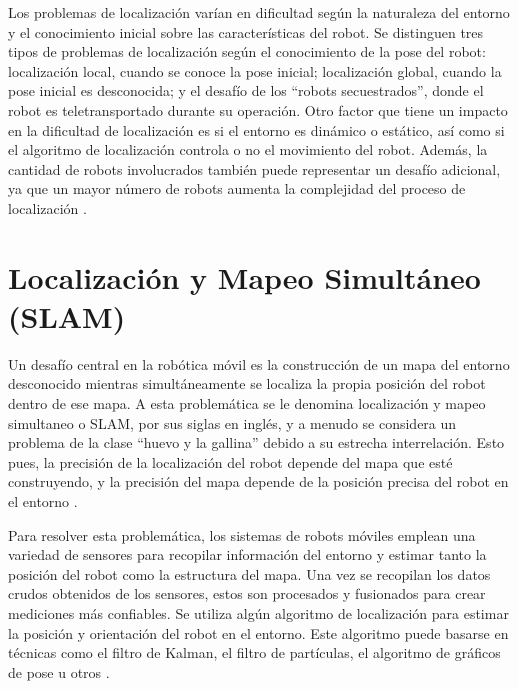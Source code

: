 Los problemas de localización varían en dificultad según la naturaleza del entorno y el conocimiento inicial sobre las características del robot. Se distinguen tres tipos de problemas de localización según el conocimiento de la pose del robot: localización local, cuando se conoce la pose inicial; localización global, cuando la pose inicial es desconocida; y el desafío de los ``robots secuestrados'', donde el robot es teletransportado durante su operación. Otro factor que tiene un impacto en la dificultad de localización es si el entorno es dinámico o estático, así como si el algoritmo de localización controla o no el movimiento del robot. Además, la cantidad de robots involucrados también puede representar un desafío adicional, ya que un mayor número de robots aumenta la complejidad del proceso de localización \cite{thrun_probabilistic_2005}.

\section{Localización y Mapeo Simultáneo (SLAM)}
Un desafío central en la robótica móvil es la construcción de un mapa del entorno desconocido mientras simultáneamente se localiza la propia posición del robot dentro de ese mapa. A esta problemática se le denomina localización y mapeo simultaneo o SLAM, por sus siglas en inglés, y a menudo se considera un problema de la clase ``huevo y la gallina'' debido a su estrecha interrelación. Esto pues, la precisión de la localización del robot depende del mapa que esté construyendo, y la precisión del mapa depende de la posición precisa del robot en el entorno \cite{corke_robotics_2017}. 

Para resolver esta problemática, los sistemas de robots móviles emplean una variedad de sensores para recopilar información del entorno y estimar tanto la posición del robot como la estructura del mapa. Una vez se recopilan los datos crudos obtenidos de los sensores, estos son procesados y fusionados para crear mediciones más confiables. Se utiliza algún algoritmo de localización para estimar la posición y orientación del robot en el entorno. Este algoritmo puede basarse en técnicas como el filtro de Kalman, el filtro de partículas, el algoritmo de gráficos de pose u otros \cite{corke_robotics_2017}. 

